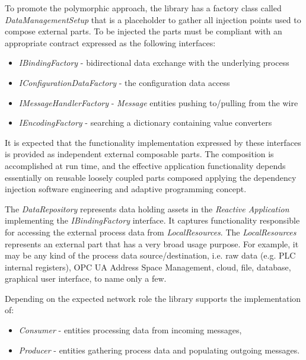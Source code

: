 \documentclass{jacsart}
\begin{document}
To promote the polymorphic approach, the library has a factory class called \emph{DataManagementSetup} that is a placeholder to gather all injection points used to compose external parts. To be injected the parts must be compliant with an appropriate contract expressed as the following interfaces:

\begin{itemize}
      \item \emph{IBindingFactory} - bidirectional data exchange with the underlying process
      \item \emph{IConfigurationDataFactory} - the configuration data access
      \item \emph{IMessageHandlerFactory} - \emph{Message} entities pushing to/pulling from the wire
      \item \emph{IEncodingFactory} - searching a dictionary containing value converters
\end{itemize}

It is expected that the functionality implementation expressed by these interfaces is provided as independent external composable parts. The composition is accomplished at run time, and the effective application functionality depends essentially on reusable loosely coupled parts composed applying the dependency injection software engineering and adaptive programming concept.



The \textit{DataRepository} represents data holding assets in the \textit{Reactive Application} implementing the \textit{IBindingFactory} interface. It captures functionality responsible for accessing the external process data from \textit{LocalResources}. The \textit{LocalResources} represents an external part that has a very broad usage purpose. For example, it may be any kind of the process data source/destination, i.e. raw data (e.g. PLC internal registers), OPC UA Address Space Management, cloud, file, database, graphical user interface, to name only a few.

Depending on the expected network role the library supports the implementation of:

\begin{itemize}
      \item \textit{Consumer} - entities processing data from incoming messages,
      \item \textit{Producer} - entities gathering process data and populating outgoing messages.
\end{itemize}
\end{document}
